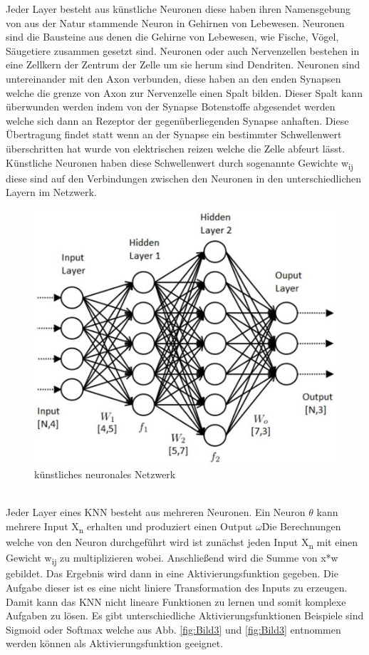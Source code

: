 \documentclass{llncs}
\begin{document}
Jeder Layer besteht aus künstliche Neuronen diese haben ihren Namensgebung von aus der Natur stammende Neuron in Gehirnen von Lebewesen. Neuronen sind die Bausteine aus denen die Gehirne von Lebewesen, wie Fische, Vögel, Säugetiere zusammen gesetzt sind. Neuronen oder auch Nervenzellen bestehen in eine Zellkern der Zentrum der Zelle um sie herum sind Dendriten. Neuronen sind untereinander mit den Axon verbunden, diese haben an den enden Synapsen welche die grenze von Axon zur Nervenzelle einen Spalt bilden. Dieser Spalt kann überwunden werden indem von der Synapse Botenstoffe abgesendet werden welche sich dann an Rezeptor der gegenüberliegenden Synapse anhaften. Diese Übertragung findet statt wenn an der Synapse ein bestimmter Schwellenwert überschritten hat wurde von elektrischen reizen welche die Zelle abfeurt lässt. Künstliche Neuronen haben diese Schwellenwert durch sogenannte Gewichte w\textsubscript{ij} diese sind auf den Verbindungen zwischen den Neuronen in den unterschiedlichen Layern im Netzwerk.
\begin{figure}[htbp] 
	\centering
	\includegraphics[width=1.0\textwidth]{neuronalesnetzwerk.jpg}
	\caption{künstliches neuronales Netzwerk}
	\label{fig:Bild2}
\end{figure}
\\
Jeder Layer eines KNN besteht aus mehreren Neuronen. Ein Neuron $\theta$ kann mehrere Input X\textsubscript{n} erhalten und produziert einen Output $\omega$\. Die Berechnungen welche von den Neuron durchgeführt wird ist zunächst jeden Input X\textsubscript{n} mit einen Gewicht w\textsubscript{ij} zu multiplizieren wobei. Anschließend wird die Summe von x*w gebildet. Das Ergebnis wird dann in eine Aktivierungsfunktion gegeben. Die Aufgabe dieser ist es eine nicht liniere Transformation des Inputs zu erzeugen. Damit kann das KNN nicht lineare Funktionen zu lernen und somit komplexe Aufgaben zu lösen. Es gibt unterschiedliche Aktivierungsfunktionen Beispiele sind Sigmoid oder Softmax welche aus Abb. \ref{fig:Bild3} und \ref{fig:Bild3} entnommen werden können als Aktivierungsfunktion geeignet. 
\end{document}
